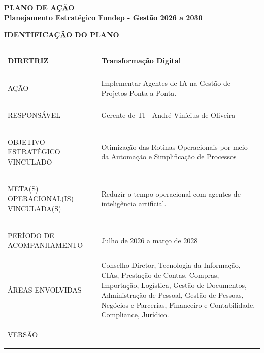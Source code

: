 \documentclass[12pt,a4paper]{article}
\newcommand{\PlanoVersao}{0.5}
\newcommand{\secao}[1]{%
  \par\vspace{\dimexpr16pt-\parskip\relax}%
  {\noindent\bfseries\color{azulTitulo}\fontsize{13}{16}\selectfont #1}%
  \par\vspace{\dimexpr8pt-\parskip\relax}%
}
\newlength{\utilTab}
\newlength{\colIdRot}\newlength{\colIdVal}
\begin{document}
\thispagestyle{empty}


\begin{center}
  \singlespacing
  {\bfseries\color{azulTitulo}\fontsize{17}{20}\selectfont PLANO DE AÇÃO}\\[6pt]
  {\bfseries\color{azulTitulo}\fontsize{13}{16}\selectfont Planejamento Estratégico Fundep - Gestão 2026 a 2030}
\end{center}

\secao{IDENTIFICAÇÃO DO PLANO}

\begingroup
\footnotesize\singlespacing
{}
\setlength{\arrayrulewidth}{1pt}
\setlength{\tabcolsep}{5.4pt}
\renewcommand{\arraystretch}{1.45}
\setlength{\utilTab}{\dimexpr\textwidth-4\tabcolsep-3\arrayrulewidth\relax}
\setlength{\colIdRot}{0.2819\utilTab}
\setlength{\colIdVal}{\dimexpr\utilTab-\colIdRot\relax}
\begin{tabular}{|>{\cellcolor{azulClaro}\bfseries\raggedright\arraybackslash}p{\colIdRot}|>{\raggedright\arraybackslash}p{\colIdVal}|}
\hline
DIRETRIZ & Transformação Digital \\
\hline
AÇÃO & Implementar Agentes de IA na Gestão de Projetos Ponta a Ponta.\\
\hline
RESPONSÁVEL & Gerente de TI - André Vinícius de Oliveira \\
\hline
OBJETIVO ESTRATÉGICO VINCULADO & Otimização das Rotinas Operacionais por meio da Automação e Simplificação de Processos \\
\hline
META(S) OPERACIONAL(IS) VINCULADA(S) & Reduzir o tempo operacional com agentes de inteligência artificial. \\
\hline
PERÍODO DE ACOMPANHAMENTO & Julho de 2026 a março de 2028 \\
\hline
ÁREAS ENVOLVIDAS & Conselho Diretor, Tecnologia da Informação, CIAs, Prestação de Contas, Compras, Importação, Logística, Gestão de Documentos, Administração de Pessoal, Gestão de Pessoas, Negócios e Parcerias, Financeiro e Contabilidade, Compliance, Jurídico. \\
\hline
VERSÃO & \PlanoVersao \\
\hline
\end{tabular}
\endgroup
\end{document}
